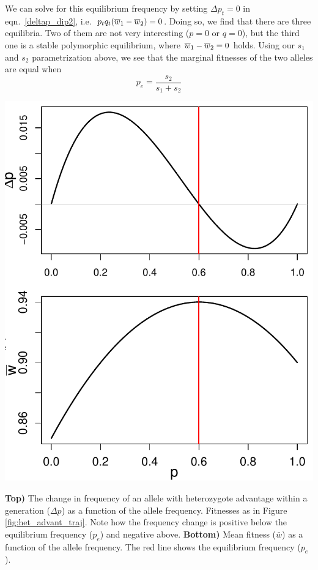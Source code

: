 We can solve for this equilibrium frequency by setting $\Delta p_t = 0$ in  eqn.\ \eqref{deltap_dip2}, 
i.e.\ $p_tq_t (\overline{w}_1-\overline{w}_2)=0$. Doing so, we find that there are
three equilibria. Two of them are not very interesting ($p=0$ or
$q=0$), but the third one is a stable polymorphic equilibrium,  where
$\overline{w}_1-\overline{w}_2=0$ holds.
Using our $s_1$ and $s_2$ parametrization above, we see that the marginal fitnesses of
the two alleles are equal when
\begin{equation}
	p_e = \frac{s_2}{s_1+s_2}
  \end{equation}
      \begin{marginfigure}
\begin{center}
  \includegraphics[width = \textwidth]{figures/het_advant_dp_wbar.pdf}
\end{center}
\caption{{\bf Top)} The change in frequency of an allele with heterozygote
  advantage within a generation ($\Delta p$) as a function of the allele
frequency. Fitnesses as in Figure \ref{fig:het_advant_traj}. Note how the frequency change is positive below the
equilibrium frequency ($p_e$) and negative above. {\bf Bottom)} Mean
fitness ($\bar{w}$) as a function of the allele frequency. The red line shows
the equilibrium frequency ($p_e$). } \label{fig:het_advant_dp_wbar}
\end{marginfigure}
